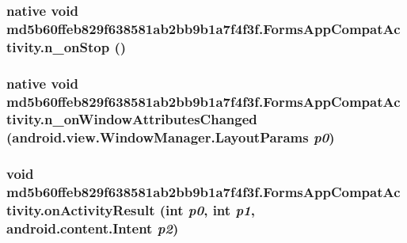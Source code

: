 \hypertarget{classmd5b60ffeb829f638581ab2bb9b1a7f4f3f_1_1_forms_app_compat_activity_b7c94c6c915fe0f4d4fcc246e42ed92b}{
\subsubsection[{n\_\-onStop}]{\setlength{\rightskip}{0pt plus 5cm}native void md5b60ffeb829f638581ab2bb9b1a7f4f3f.FormsAppCompatActivity.n\_\-onStop ()}}
\label{classmd5b60ffeb829f638581ab2bb9b1a7f4f3f_1_1_forms_app_compat_activity_b7c94c6c915fe0f4d4fcc246e42ed92b}


\hypertarget{classmd5b60ffeb829f638581ab2bb9b1a7f4f3f_1_1_forms_app_compat_activity_927f9e61afb997958c9cc42cc18ef610}{
\subsubsection[{n\_\-onWindowAttributesChanged}]{\setlength{\rightskip}{0pt plus 5cm}native void md5b60ffeb829f638581ab2bb9b1a7f4f3f.FormsAppCompatActivity.n\_\-onWindowAttributesChanged (android.view.WindowManager.LayoutParams {\em p0})}}
\label{classmd5b60ffeb829f638581ab2bb9b1a7f4f3f_1_1_forms_app_compat_activity_927f9e61afb997958c9cc42cc18ef610}


\hypertarget{classmd5b60ffeb829f638581ab2bb9b1a7f4f3f_1_1_forms_app_compat_activity_f329e41b3d57d0e505dd932a5d073788}{
\subsubsection[{onActivityResult}]{\setlength{\rightskip}{0pt plus 5cm}void md5b60ffeb829f638581ab2bb9b1a7f4f3f.FormsAppCompatActivity.onActivityResult (int {\em p0}, \/  int {\em p1}, \/  android.content.Intent {\em p2})}}
\label{classmd5b60ffeb829f638581ab2bb9b1a7f4f3f_1_1_forms_app_compat_activity_f329e41b3d57d0e505dd932a5d073788}




